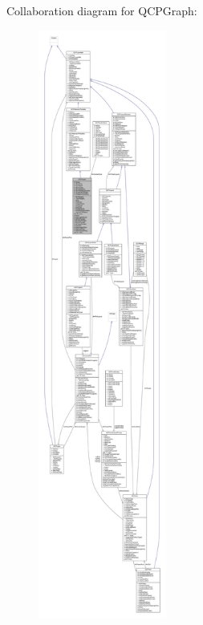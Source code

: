 Collaboration diagram for Q\+C\+P\+Graph\+:\nopagebreak
\begin{figure}[H]
\begin{center}
\leavevmode
\includegraphics[height=550pt]{class_q_c_p_graph__coll__graph}
\end{center}
\end{figure}

